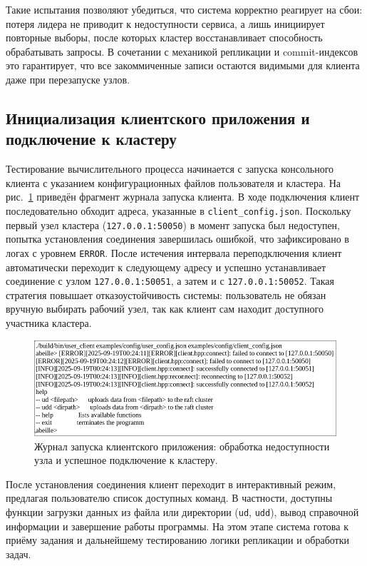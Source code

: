 Такие испытания позволяют убедиться, что система корректно реагирует на сбои:
потеря лидера не приводит к недоступности сервиса, а лишь инициирует повторные
выборы, после которых кластер восстанавливает способность обрабатывать запросы.
В сочетании с механикой репликации и commit-индексов это гарантирует, что все
закоммиченные записи остаются видимыми для клиента даже при перезапуске узлов.

\subsection{Инициализация клиентского приложения и подключение к кластеру}

Тестирование вычислительного процесса начинается с запуска консольного клиента
с указанием конфигурационных файлов пользователя и кластера. На
рис.~\ref{fig:client_start} приведён фрагмент журнала запуска клиента. В ходе
подключения клиент последовательно обходит адреса, указанные в
\texttt{client\_config.json}. Поскольку первый узел кластера
(\texttt{127.0.0.1:50050}) в момент запуска был недоступен, попытка
установления соединения завершилась ошибкой, что зафиксировано в логах с
уровнем \texttt{ERROR}. После истечения интервала переподключения клиент
автоматически переходит к следующему адресу и успешно устанавливает соединение
с узлом \texttt{127.0.0.1:50051}, а затем и с \texttt{127.0.0.1:50052}. Такая
стратегия повышает отказоустойчивость системы: пользователь не обязан вручную
выбирать рабочий узел, так как клиент сам находит доступного участника
кластера.

\begin{figure}[h!]
    \centering
    \includegraphics[width=0.8\linewidth]{inc/client-shell.png}
    \caption{Журнал запуска клиентского приложения: обработка недоступности узла и
    успешное подключение к кластеру.}
    \label{fig:client_start}
\end{figure}

После установления соединения клиент переходит в интерактивный режим, предлагая
пользователю список доступных команд. В частности, доступны функции загрузки
данных из файла или директории (\texttt{ud}, \texttt{udd}), вывод справочной
информации и завершение работы программы. На этом этапе система готова к
приёму задания и дальнейшему тестированию логики репликации и обработки задач.

